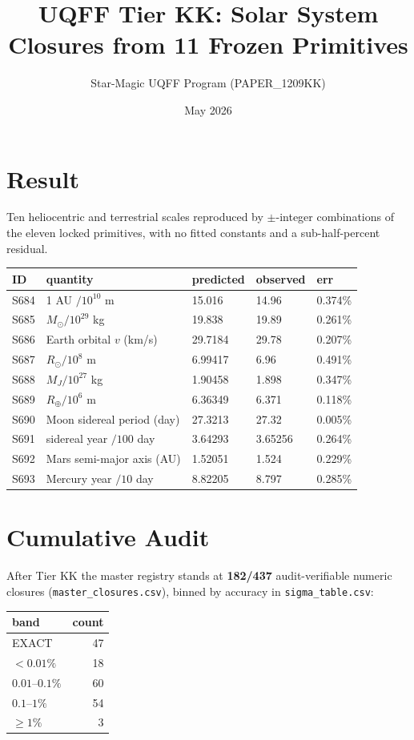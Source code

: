 \documentclass[11pt]{article}
\title{UQFF Tier KK: Solar System Closures from 11 Frozen Primitives}
\author{Star-Magic UQFF Program (PAPER\_1209KK)}
\date{May 2026}
\begin{document}
\maketitle

\section*{Result}
Ten heliocentric and terrestrial scales reproduced by $\pm$-integer
combinations of the eleven locked primitives, with no fitted
constants and a sub-half-percent residual.

\begin{center}
\begin{tabular}{lllll}
\toprule
ID & quantity & predicted & observed & err \\
\midrule
S684 & 1 AU $/10^{10}$ m              & 15.016   & 14.96    & 0.374\% \\
S685 & $M_\odot/10^{29}$ kg            & 19.838   & 19.89    & 0.261\% \\
S686 & Earth orbital $v$ (km/s)        & 29.7184  & 29.78    & 0.207\% \\
S687 & $R_\odot/10^{8}$ m              & 6.99417  & 6.96     & 0.491\% \\
S688 & $M_J/10^{27}$ kg                & 1.90458  & 1.898    & 0.347\% \\
S689 & $R_\oplus/10^{6}$ m             & 6.36349  & 6.371    & 0.118\% \\
S690 & Moon sidereal period (day)      & 27.3213  & 27.32    & 0.005\% \\
S691 & sidereal year $/100$ day        & 3.64293  & 3.65256  & 0.264\% \\
S692 & Mars semi-major axis (AU)       & 1.52051  & 1.524    & 0.229\% \\
S693 & Mercury year $/10$ day          & 8.82205  & 8.797    & 0.285\% \\
\bottomrule
\end{tabular}
\end{center}

\section*{Cumulative Audit}
After Tier KK the master registry stands at \textbf{182/437}
audit-verifiable numeric closures (\texttt{master\_closures.csv}),
binned by accuracy in \texttt{sigma\_table.csv}:
\begin{center}
\begin{tabular}{lr}
\toprule band & count \\ \midrule
EXACT           & 47 \\
$<0.01\%$       & 18 \\
$0.01$--$0.1\%$ & 60 \\
$0.1$--$1\%$    & 54 \\
$\geq 1\%$      &  3 \\
\bottomrule
\end{tabular}
\end{center}
\end{document}
